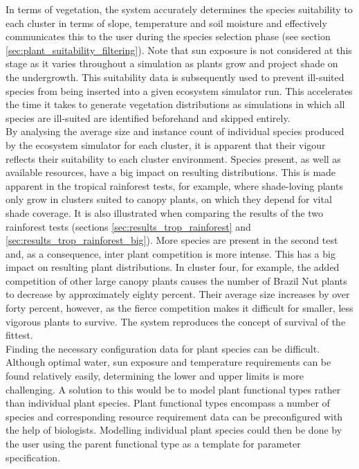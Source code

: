 In terms of vegetation, the system accurately determines the species suitability to each cluster in terms of slope, temperature and soil moisture and effectively communicates this to the user during the species selection phase (see section \ref{sec:plant_suitability_filtering}). Note that sun exposure is not considered at this stage as it varies throughout a simulation as plants grow and project shade on the undergrowth. This suitability data is subsequently used to prevent ill-suited species from being inserted into a given ecosystem simulator run. This accelerates the time it takes to generate vegetation distributions as simulations in which all species are ill-suited are identified beforehand and skipped entirely. \\
By analysing the average size and instance count of individual species produced by the ecosystem simulator for each cluster, it is apparent that their vigour reflects their suitability to each cluster environment. Species present, as well as available resources, have a big impact on resulting distributions. This is made apparent in the tropical rainforest tests, for example, where shade-loving plants only grow in clusters suited to canopy plants, on which they depend for vital shade coverage. It is also illustrated when comparing the results of the two rainforest tests (sections \ref{sec:results_trop_rainforest} and \ref{sec:results_trop_rainforest_big}). More species are present in the second test and, as a consequence, inter plant competition is more intense. This has a big impact on resulting plant distributions. In cluster four, for example, the added competition of other large canopy plants causes the number of Brazil Nut plants to decrease by approximately eighty percent. Their average size increases by over forty percent, however, as the fierce competition makes it difficult for smaller, less vigorous plants to survive. The system reproduces the concept of survival of the fittest.\\

Finding the necessary configuration data for plant species can be difficult. Although optimal water, sun exposure and temperature requirements can be found relatively easily, determining the lower and upper limits is more challenging. A solution to this would be to model plant functional types \cite{Moncrieff2015} rather than individual plant species. Plant functional types encompass a number of species and corresponding resource requirement data can be preconfigured with the help of biologists. Modelling individual plant species could then be done by the user using the parent functional type as a template for parameter specification.\\
